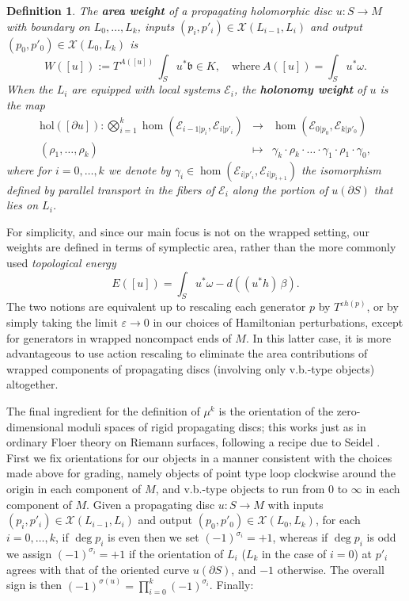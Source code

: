 \documentclass[11pt,leqno]{amsart}
\newtheorem{defi}[theo]{Definition}
\numberwithin{equation}{section}
\newcommand{\cE}{{\mathcal E}}
\newcommand{\cX}{{\mathcal X}}
\begin{document}
\begin{defi} The {\bf area weight} of a 
propagating holomorphic disc $u:S\to M$ with boundary on $L_0,\dots,L_k$,
inputs $(p_i,p'_i)\in \cX(L_{i-1},L_i)$ and output $(p_0,p'_0)\in \cX(L_0,L_k)$
is $$W([u]):=T^{A([u])}\,\int_S u^*\mathfrak{b}\in K, \quad \text{where}\ A([u])=\int_S u^*\omega.$$
When the $L_i$ are equipped with local systems $\cE_i$, the {\bf holonomy weight} of $u$ is the map
\begin{eqnarray*}
\mathrm{hol}([\partial u]):\bigotimes_{i=1}^k \hom(\cE_{i-1|p_i},\cE_{i|p'_i})&\to& \hom(\cE_{0|p_0},\cE_{k|p'_0})\\[-6pt]
(\rho_1,\dots,\rho_k)&\mapsto& \gamma_k\cdot \rho_k\cdot \dots \cdot \gamma_1\cdot \rho_1\cdot \gamma_0,
\end{eqnarray*}
where for $i=0,\dots,k$ we denote by $\gamma_i\in \hom(\cE_{i|p'_i},\cE_{i|p_{i+1}})$ the isomorphism
defined by parallel transport in the fibers of $\cE_i$ along the
portion of $u(\partial S)$ that lies on $L_i$.
\end{defi}

For simplicity, and since our main focus is not on the wrapped setting, our weights are defined in terms of symplectic area, rather than the more commonly used
{\em topological energy}
$$E([u])=\int_S u^*\omega-d((u^*h)\,\beta).$$
The two notions are equivalent up to rescaling each generator $p$ by $T^{\varepsilon h(p)}$, or
by simply taking the limit $\varepsilon\to 0$ in our choices of Hamiltonian perturbations, except for generators in
wrapped noncompact ends of $M.$ In this latter case, it is more advantageous 
to use action rescaling to eliminate the area contributions of wrapped components
of propagating discs (involving only v.b.-type objects) altogether.

The final ingredient for the definition of $\mu^k$ is the orientation of
the zero-dimensional moduli spaces of rigid propagating discs; this works
just as in ordinary Floer theory on Riemann surfaces, following a recipe
due to Seidel \cite[\S 13]{SeBook}. First we fix orientations for our objects
in a manner consistent with the choices made above for grading, namely
objects of point type loop clockwise around the origin
in each component of $M$, and v.b.-type objects to run from 0 to $\infty$ in each component of $M$.
Given a propagating disc $u:S\to M$ with inputs $(p_i,p'_i)\in \cX(L_{i-1},L_i)$
and output $(p_0,p'_0)\in \cX(L_0,L_k)$, for each $i=0,\dots,k$, if $\deg p_i$ is even
then we set $(-1)^{\sigma_i}=+1$, whereas if $\deg p_i$ is odd
we assign $(-1)^{\sigma_i}=+1$ if the orientation of $L_i$ ($L_k$ in the case of $i=0$)
at $p'_i$ agrees with that of the oriented curve $u(\partial S)$, and $-1$ otherwise.
The overall sign is then $(-1)^{\sigma(u)}=\prod_{i=0}^k (-1)^{\sigma_i}$.  Finally:
\end{document}
